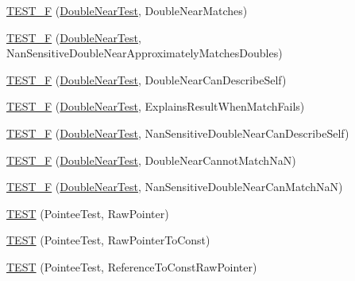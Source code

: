 \begin{DoxyCompactItemize}
\item 
\hyperlink{namespacetesting_1_1gmock__matchers__test_ab2949593472038919b8f3e1b2da204bc}{T\+E\+S\+T\+\_\+F} (\hyperlink{namespacetesting_1_1gmock__matchers__test_aea537d0183ccc65b5c49a75d711993c8}{Double\+Near\+Test}, Double\+Near\+Matches)
\item 
\hyperlink{namespacetesting_1_1gmock__matchers__test_add8765ad2bb98f4b064ee77b4c21a612}{T\+E\+S\+T\+\_\+F} (\hyperlink{namespacetesting_1_1gmock__matchers__test_aea537d0183ccc65b5c49a75d711993c8}{Double\+Near\+Test}, Nan\+Sensitive\+Double\+Near\+Approximately\+Matches\+Doubles)
\item 
\hyperlink{namespacetesting_1_1gmock__matchers__test_a31d14a68cacbaab3fafd26247cc11f9c}{T\+E\+S\+T\+\_\+F} (\hyperlink{namespacetesting_1_1gmock__matchers__test_aea537d0183ccc65b5c49a75d711993c8}{Double\+Near\+Test}, Double\+Near\+Can\+Describe\+Self)
\item 
\hyperlink{namespacetesting_1_1gmock__matchers__test_a4250d3de38128f3452a0a9e93173bdb4}{T\+E\+S\+T\+\_\+F} (\hyperlink{namespacetesting_1_1gmock__matchers__test_aea537d0183ccc65b5c49a75d711993c8}{Double\+Near\+Test}, Explains\+Result\+When\+Match\+Fails)
\item 
\hyperlink{namespacetesting_1_1gmock__matchers__test_ad147bef4b26c0a060cb4d25fe517a3e3}{T\+E\+S\+T\+\_\+F} (\hyperlink{namespacetesting_1_1gmock__matchers__test_aea537d0183ccc65b5c49a75d711993c8}{Double\+Near\+Test}, Nan\+Sensitive\+Double\+Near\+Can\+Describe\+Self)
\item 
\hyperlink{namespacetesting_1_1gmock__matchers__test_a9542b930e1de4d087a8655855edcc13c}{T\+E\+S\+T\+\_\+F} (\hyperlink{namespacetesting_1_1gmock__matchers__test_aea537d0183ccc65b5c49a75d711993c8}{Double\+Near\+Test}, Double\+Near\+Cannot\+Match\+NaN)
\item 
\hyperlink{namespacetesting_1_1gmock__matchers__test_a7c8d850697cb6cc030a4b05eeecffb72}{T\+E\+S\+T\+\_\+F} (\hyperlink{namespacetesting_1_1gmock__matchers__test_aea537d0183ccc65b5c49a75d711993c8}{Double\+Near\+Test}, Nan\+Sensitive\+Double\+Near\+Can\+Match\+NaN)
\item 
\hyperlink{namespacetesting_1_1gmock__matchers__test_ad6a13303d164fa9ca035a137840b78cb}{T\+E\+ST} (Pointee\+Test, Raw\+Pointer)
\item 
\hyperlink{namespacetesting_1_1gmock__matchers__test_a84a21ee7de697401049cb932f859ee33}{T\+E\+ST} (Pointee\+Test, Raw\+Pointer\+To\+Const)
\item 
\hyperlink{namespacetesting_1_1gmock__matchers__test_aebba40e49fe790490ba88984fdc7c7a6}{T\+E\+ST} (Pointee\+Test, Reference\+To\+Const\+Raw\+Pointer)

\end{DoxyCompactItemize}
